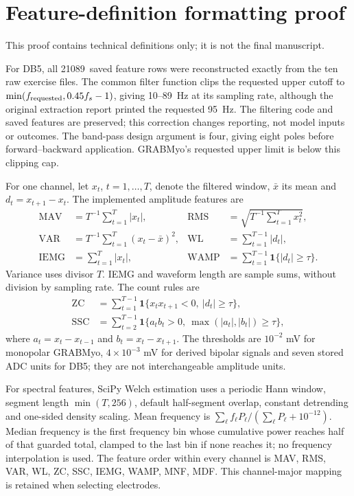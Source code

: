 \documentclass{iopjournal}
\begin{document}
\section*{Feature-definition formatting proof}
This proof contains technical definitions only; it is not the final manuscript.
\newcommand{\RevDBFiveBandLow}{10}
\newcommand{\RevDBFiveBandHigh}{89}
\newcommand{\RevDBFiveBandRequestedHigh}{95}
\newcommand{\RevDBFiveFeatureRows}{21089}

For DB5, all \RevDBFiveFeatureRows\ saved feature rows were reconstructed exactly from the ten raw exercise files. The common filter function clips the requested upper cutoff to $\min(f_{\rm requested},0.45f_s-1)$, giving \RevDBFiveBandLow--\RevDBFiveBandHigh\ Hz at its sampling rate, although the original extraction report printed the requested \RevDBFiveBandRequestedHigh\ Hz. The filtering code and saved features are preserved; this correction changes reporting, not model inputs or outcomes. The band-pass design argument is four, giving eight poles before forward--backward application. GRABMyo's requested upper limit is below this clipping cap.

For one channel, let $x_t$, $t=1,\ldots,T$, denote the filtered window, $\bar x$ its mean and $d_t=x_{t+1}-x_t$. The implemented amplitude features are
\begin{align*}
\mathrm{MAV}&=T^{-1}\sum_{t=1}^T|x_t|,&
\mathrm{RMS}&=\sqrt{T^{-1}\sum_{t=1}^Tx_t^2},\\
\mathrm{VAR}&=T^{-1}\sum_{t=1}^T(x_t-\bar x)^2,&
\mathrm{WL}&=\sum_{t=1}^{T-1}|d_t|,\\
\mathrm{IEMG}&=\sum_{t=1}^T|x_t|,&
\mathrm{WAMP}&=\sum_{t=1}^{T-1}\mathbf{1}\{|d_t|\ge\tau\}.
\end{align*}
Variance uses divisor $T$. IEMG and waveform length are sample sums, without division by sampling rate. The count rules are
\begin{align*}
\mathrm{ZC}&=\sum_{t=1}^{T-1}\mathbf{1}\{x_tx_{t+1}<0,\ |d_t|\ge\tau\},\\
\mathrm{SSC}&=\sum_{t=2}^{T-1}\mathbf{1}\{a_tb_t>0,\ \max(|a_t|,|b_t|)\ge\tau\},
\end{align*}
where $a_t=x_t-x_{t-1}$ and $b_t=x_t-x_{t+1}$. The thresholds are $10^{-2}$ mV for monopolar GRABMyo, $4\times10^{-3}$ mV for derived bipolar signals and seven stored ADC units for DB5; they are not interchangeable amplitude units.

For spectral features, SciPy Welch estimation uses a periodic Hann window, segment length $\min(T,256)$, default half-segment overlap, constant detrending and one-sided density scaling. Mean frequency is $\sum_\ell f_\ell P_\ell/(\sum_\ell P_\ell+10^{-12})$. Median frequency is the first frequency bin whose cumulative power reaches half of that guarded total, clamped to the last bin if none reaches it; no frequency interpolation is used. The feature order within every channel is MAV, RMS, VAR, WL, ZC, SSC, IEMG, WAMP, MNF, MDF. This channel-major mapping is retained when selecting electrodes.
\end{document}
